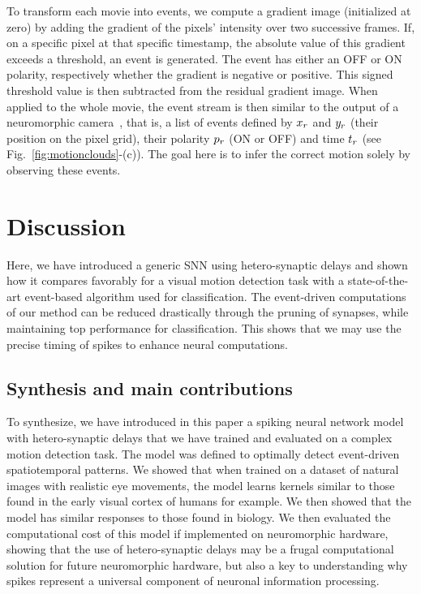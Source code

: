 \documentclass[default]{sn-jnl}%
\theoremstyle{thmstyleone}%
\theoremstyle{thmstyletwo}%
\theoremstyle{thmstylethree}%
\newcommand{\seeFig}[1]{see Fig.~\ref{fig:#1}}%
\begin{document}
To transform each movie into events, we compute a gradient image (initialized at zero) by adding the gradient of the pixels' intensity over two successive frames. If, on a specific pixel at that specific timestamp, the absolute value of this gradient exceeds a threshold, an event is generated. The event has either an OFF or ON polarity, respectively whether the gradient is negative or positive. This signed threshold value is then subtracted from the residual gradient image. When applied to the whole movie, the event stream is then similar to the output of a neuromorphic camera~\citep{rasetto_challenges_2022}, that is, a list of events defined by $x_r$ and $y_r$ (their position on the pixel grid), their polarity $p_r$ (ON or OFF) and time $t_r$  (\seeFig{motionclouds}-(c)). The goal here is to infer the correct motion solely by observing these events.


\section{Discussion}

Here, we have introduced a generic SNN using hetero-synaptic delays and shown how it compares favorably for a visual motion detection task with a state-of-the-art event-based algorithm used for classification. The event-driven computations of our method can be reduced drastically through the pruning of synapses, while maintaining top performance for classification. This shows that we may use the precise timing of spikes to enhance neural computations. 

\subsection{Synthesis and main contributions}
To synthesize, we have introduced in this paper a spiking neural network model with hetero-synaptic delays that we have trained and evaluated on a complex motion detection task. The model was defined to optimally detect event-driven spatiotemporal patterns. We showed that when trained on a dataset of natural images with realistic eye movements, the model learns kernels similar to those found in the early visual cortex of humans for example. We then showed that the model has similar responses to those found in biology. We then evaluated the computational cost of this model if implemented on neuromorphic hardware, showing that the use of hetero-synaptic delays may be a frugal computational solution for future neuromorphic hardware, but also a key to understanding why spikes represent a universal component of neuronal information processing.
\end{document}
